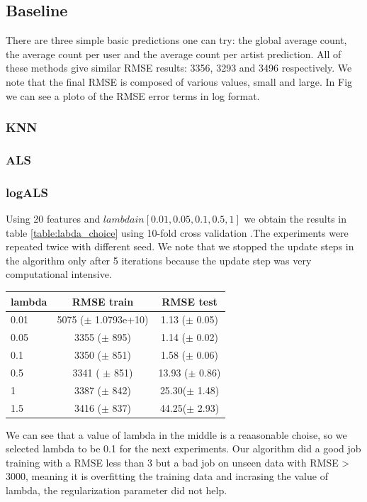 \subsection{Baseline}
There are three simple basic predictions one can try: the global average count, the average count per user and the average count
per artist prediction. All of these methods give similar RMSE results: 3356, 3293 and 3496 respectively.
We note that the final RMSE is composed of various values, small and large. In Fig we can see a ploto of the RMSE error terms in log format.

\subsubsection{KNN}
\subsubsection{ALS}

\subsubsection{logALS}
Using 20 features and $lambda in [0.01,0.05,0.1,0.5,1]$ we obtain the results in table \ref{table:labda_choice} using 10-fold cross validation .The experiments were repeated twice with different seed. We note that we stopped the update steps in the algorithm only after 5 iterations because the update step was very computational intensive.
\begin{center}
  \begin{tabular}{ |l | c | c| }
    \hline
     lambda & RMSE train & RMSE test \\ \hline
     0.01   & 5075 ($\pm$  1.0793e+10) & 1.13 ($\pm$ 0.05) \\ \hline
     0.05  &  3355 ($\pm$  895)            &                1.14 ($\pm$  0.02)                   \\ \hline
     0.1     & 3350 ($\pm$ 851)  & 1.58 ($\pm$ 0.06) \\ \hline
     0.5    & 3341  ( $\pm$ 851)   &13.93 ($\pm$ 0.86)\\ \hline
     1       & 3387 ($\pm$ 842)   &25.30($\pm$ 1.48)\\ \hline
     1.5    & 3416 ($\pm$ 837) & 44.25($\pm$ 2.93) \\
    \hline
  \end{tabular}
  	\label{table:labda_choice}
\end{center}
We can see that a value of lambda in the middle is a reaasonable choise, so we selected lambda to be 0.1 for the next experiments.
Our algorithm did a good job training  with a RMSE less than  3 but a bad job on unseen data with RMSE > 3000, meaning it is overfitting 
the training data and incrasing the value of lambda, the regularization parameter did not help.


